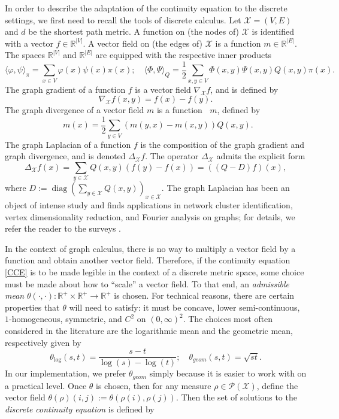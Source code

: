 \documentclass{article}
\DeclareMathOperator*{\diag}{diag}
\newcommand{\R}{\mathbb{R}}
\newcommand{\X}{\mathcal{X}}
\DeclareMathOperator*{\divx}{div_{\X}}
\begin{document}
In order to describe the adaptation of the continuity equation to the discrete settings, we first need to recall the tools of discrete calculus. Let \(\X = (V,E)\) and \(d\) be the shortest path metric. A function on (the nodes of) \(\X\) is identified with a vector \(f \in \R^{|V|}\). A vector field on (the edges of) \(\X\) is a function \(m \in \R^{|E|}\). The spaces \(\R^{|V|}\) and \(\R^{|E|}\) are equipped with the respective inner products
\begin{equation*}
  \langle\varphi,\psi\rangle_\pi = \sum\limits_{x \in V} \varphi(x)\psi(x)\pi(x); \quad \langle\Phi,\Psi\rangle_Q = \frac{1}{2}\sum\limits_{x,y\in V}\Phi(x,y)\Psi(x,y)Q(x,y)\pi(x).
\end{equation*}
The graph gradient of a function \(f\) is a vector field \(\nabla_\X f\), and is defined by
\begin{equation*}
  \nabla_{\X}f(x,y) = f(x) - f(y).
\end{equation*}
The graph divergence of a vector field \(m\) is a function \(\divx m\), defined by
\begin{equation*}
  \divx m(x) = \frac{1}{2}\sum_{y \in V} (m(y,x) - m(x,y))Q(x,y).
\end{equation*}
The graph Laplacian of a function \(f\) is the composition of the graph gradient and graph divergence, and is denoted \(\Delta_{\X}f\).  The operator \(\Delta_{\X}\) admits the explicit form
\begin{equation*}
    \Delta_{\X}f(x) = \sum\limits_{y\in\X} Q(x,y)(f(y) - f(x)) = ((Q - D)f)(x),
\end{equation*}
where \(D := \diag\left(\sum_{y \in \X}Q(x,y)\right)_{x\in \X}\). The graph Laplacian has been an object of intense study and finds applications in network cluster identification, vertex dimensionality reduction, and Fourier analysis on graphs; for details, we refer the reader to the surveys \cite{merrisSurveyGraphLaplacians1995, merris1994laplacian, stankovicGraphSignalProcessing2019}.

In the context of graph calculus, there is no way to multiply a vector field by a function and obtain another vector field. Therefore, if the continuity equation \eqref{CCE} is to be made legible in the context of a discrete metric space, some choice must be made about how to ``scale'' a vector field. To that end, an \emph{admissible mean} \(\theta(\cdot,\cdot): \R^+ \times \R^+ \to \R^+\) is chosen. For technical reasons, there are certain properties that \(\theta\) will need to satisfy: it must be concave, lower semi-continuous, \(1\)-homogeneous, symmetric, and \(C^2\) on \((0, \infty)^2\). The choices most often considered in the literature are the logarithmic mean and the geometric mean, respectively given by
\begin{equation*}
  \theta_{\log}(s,t) = \frac{s - t}{\log(s) - \log(t)}; \quad \theta_{geom}(s,t) = \sqrt{st}.
\end{equation*}
In our implementation, we prefer \(\theta_{geom}\) simply because it is easier to work with on a practical level. Once \(\theta\) is chosen, then for any measure \(\rho \in \mathcal{P}(\X)\), define the vector field \(\theta(\rho)(i,j) := \theta(\rho(i),\rho(j))\). Then the set of solutions to the \emph{discrete continuity equation} is defined by
\end{document}
